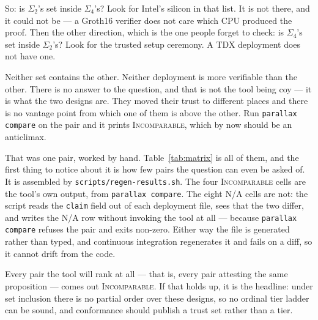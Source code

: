 \documentclass[11pt]{article}
\newcommand{\parallax}{\texttt{parallax}}
\begin{document}
So: is $\Sigma_2$'s set inside $\Sigma_4$'s? Look for Intel's silicon in that
list. It is not there, and it could not be --- a Groth16 verifier does not
care which CPU produced the proof. Then the other direction, which is the one
people forget to check: is $\Sigma_4$'s set inside $\Sigma_2$'s? Look for the
trusted setup ceremony. A TDX deployment does not have one.

Neither set contains the other. Neither deployment is more verifiable than
the other. There is no answer to the question, and that is not the tool being
coy --- it is what the two designs are. They moved their trust to different
places and there is no vantage point from which one of them is above the
other. Run \texttt{parallax compare} on the pair and it prints
\textsc{Incomparable}, which by now should be an anticlimax.

That was one pair, worked by hand. Table~\ref{tab:matrix} is all of them, and
the first thing to notice about it is how few pairs the question can even be
asked of. It is assembled by \texttt{scripts/\allowbreak regen-results.sh}. The
four \textsc{Incomparable} cells are the tool's own output, from
\texttt{parallax compare}. The eight N/A cells are not: the script reads the
\texttt{claim} field out of each deployment file, sees that the two differ,
and writes the N/A row without invoking the tool at all --- because
\texttt{parallax compare} refuses the pair and exits non-zero. Either way the
file is generated rather than typed, and continuous integration regenerates
it and fails on a diff, so it cannot drift from the code.

\begin{table}[h]
\centering\small
\caption{Every ordered pair among the four non-hybrid deployments
$\Sigma_1$--$\Sigma_4$ under set inclusion. Pairs attesting different
propositions are marked N/A rather than omitted: \parallax{} refuses to rank
verifiability across two different claims, and a truncated matrix would be
indistinguishable from a broken run. Eight of the twelve ordered pairs are
N/A, so the table rests on two unordered comparisons ---
$\Sigma_1$/$\Sigma_3$ and $\Sigma_2$/$\Sigma_4$.}
\label{tab:matrix}

\end{table}

Every pair the tool will rank at all --- that is, every pair attesting the
same proposition --- comes out \textsc{Incomparable}. If that holds up, it is
the headline: under set inclusion there is no partial order over these
designs, so no ordinal tier ladder can be sound, and conformance should
publish a trust set rather than a tier.
\end{document}
